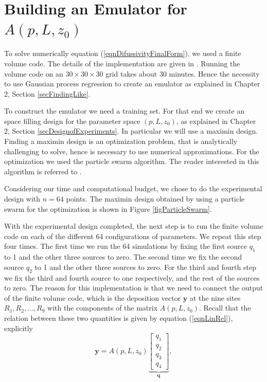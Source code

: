 \documentclass[12pt]{book}
\newcommand{\q}{\textbf{q}}
\newcommand{\y}{\textbf{y}}
\begin{document}
\section{Building an  Emulator for $A(p,L,z_{0})$}

To solve numerically
equation (\ref{eqnDifussivityFinalForm}), we used a finite volume code. The details
of the implementation are given in \cite{hosseini2016airborne}. Running the 
volume code on an $30\times 30\times 30$ grid takes about 30 minutes. Hence the 
necessity to use Gaussian process regression to create an emulator
as explained in Chapter 2, Section \ref{secFindingLike}.

To construct the emulator we need a training set. For that end we create an space filling design for 
the parameter space $(p,L,z_{0})$, as explained
in Chapter 2, Section \ref{secDesignofExperiments}. In  particular
we will use a maximin design. 
Finding a maximin design
is an optimization problem, that is analytically  challenging to solve, hence is
necessary to use numerical approximations. For the optimization  we used 
the particle swarm algorithm. The reader interested in this algorithm
is referred to \cite{arora2015optimization}.  

Considering our time and computational budget, we  chose to 
do the experimental design with $n=64$ points. The maximin
design obtained by using a particle swarm for the 
optimization is shown in Figure \ref{figParticleSwarm}.

With the experimental design completed, the next step is to run the finite volume code 
on each of the different 64 configurations of parameters. We repeat this step four
times. The first time we run the 64 simulations by fixing the first source $q_{1}$ to 1
and the other three sources to zero. The second time we fix the second source $q_{2}$ to 1
and the other three sources to zero. For the third and fourth step we  fix the 
third and fourth source to one respectively, and the rest of the sources to zero. The reason
for this implementation is that we need to connect the output of the finite
volume code, which is the deposition vector $\y$ at the nine sites $R_{1},R_{2},\ldots,R_{9}$
with the components of the matrix $A(p,L,z_{0})$. Recall that the relation between these two quantities 
is given by equation (\ref{eqnLinRel}), explicitly 
\begin{equation}\label{eqnReminder}
\y=A(p,L,z_{0})\underbrace{\begin{bmatrix}
q_{1}\\q_{2}\\q_{3}\\q_{4}
\end{bmatrix}}_{\q},
\end{equation}
\end{document}
